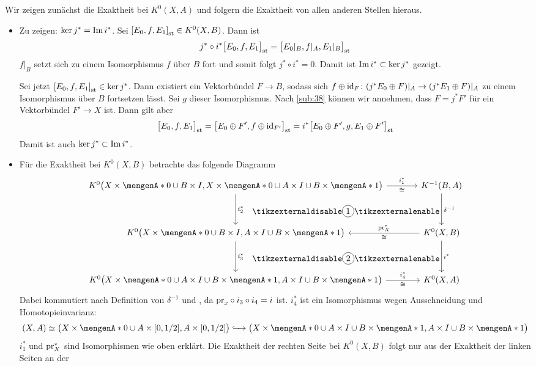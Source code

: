 \begin{beweis}
Wir zeigen zunächst die Exaktheit bei $K^0(X,A)$ und folgern die Exaktheit von allen anderen Stellen hieraus.
\begin{itemize}
	\item Zu zeigen: $\ker j^* = \im i^*$. Sei $\benbrace*{E_0,f,E_1}_\st \in K^0(X,B)$. Dann ist 
	\[
		j^* \circ i^* \benbrace[\big]{E_0,f,E_1}_\st = \benbrace[\big]{E_0|_B,f|_A,E_1|_B}_\st
	\]
	$f|_B$ setzt sich zu einem Isomorphismus $f$ über $B$ fort und somit folgt $j^* \circ i^* =0$. Damit ist $\im i^* \subset \ker j^*$ gezeigt.
	
	Sei jetzt $\benbrace*{E_0,f,E_1}_\st \in \ker j^*$. Dann existiert ein Vektorbündel $F \to B$, sodass sich 
	$f \oplus \id_F \colon (j^* E_0 \oplus F)|_A \to (j^* E_1 \oplus F)|_A$ zu einem Isomorphismus über $B$ fortsetzen lässt. Sei $g$ dieser Isomorphismus. Nach 
	\autoref{sub:38} können wir annehmen, dass $F =j^* F'$ für ein Vektorbündel $F' \to X$ ist. Dann gilt aber
	\[
		\benbrace[\big]{E_0,f,E_1}_\st = \benbrace[\big]{E_0 \oplus F',f \oplus \id_{F'}}_\st = i^* \benbrace[\big]{E_0 \oplus F', g, E_1 \oplus F'}_\st 
	\]
	Damit ist auch $\ker j^* \subset \im i^*$.
	\item Für die Exaktheit bei $K^0(X,B)$ betrachte das folgende Diagramm
	\[
		\begin{tikzcd}[column sep=large,row sep=huge]
			K^0 \enbrace[\big]{X \times \set{0} \cup B \times I, X \times \set{0} \cup A \times I \cup B \times \set{1}} \rar["i_1^*","\cong"'] \dar["i_2^*"] 
			\drar[phantom,"\circled{\text{1}}"]
			& K^{-1}(B,A) \dar["\delta ^{-1}"] \\
			K^0 \enbrace[\big]{X \times \set{0} \cup B \times I, A \times I \cup B \times \set{1}} \dar["i_3^*"] \drar[phantom,"\circled{\text{2}}"]
			& K^0(X,B) \lar["\pr_X^*"',"\cong"] \dar["i^*"] \\
			K^0 \enbrace[\big]{X \times \set{0} \cup A \times I \cup B \times \set{1}, A \times I \cup B \times \set{1}} \rar["i_4^*","\cong"'] & K^0(X,A)
		\end{tikzcd}
	\]
	Dabei kommutiert  nach Definition von $\delta ^{-1}$ und , da $\pr_x \circ i_3 \circ i_4 = i$ ist. $i_4^*$ ist ein Isomorphismus wegen 
	Ausschneidung und Homotopieinvarianz:
	\[
		(X,A)\simeq \enbrace[\big]{X \times \set{0}  \cup A \times [0,1/2], A \times [0,1/2]} \xhookrightarrow{\minwidthbox{ }{1em}} 
		\enbrace[\big]{X \times \set{0} \cup A \times I \cup B \times \set{1}, A \times I \cup B \times \set{1}}
	\]
	$i_1^*$ und $\pr_X^*$ sind Isomorphismen wie oben erklärt. Die Exaktheit der rechten Seite bei $K^0(X,B)$ folgt nur aus der Exaktheit der linken Seiten an der 

\end{itemize}
\end{beweis}
